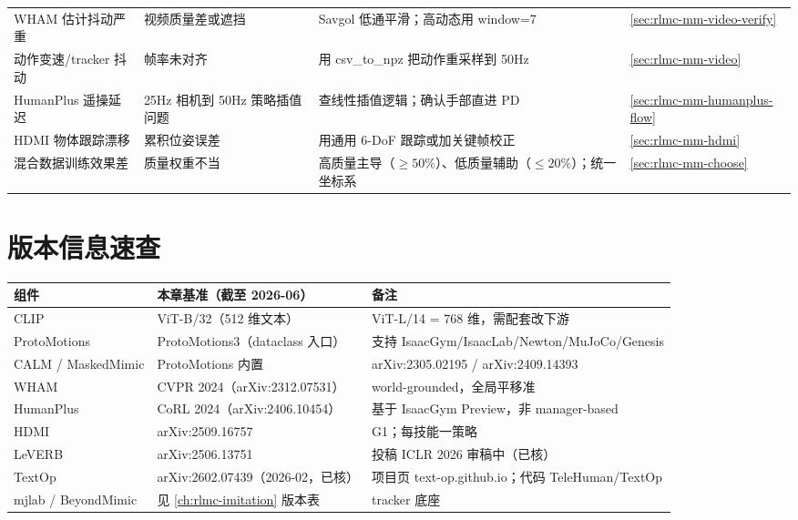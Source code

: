 \begin{center}
\begin{tabular}{@{}p{3.4cm}p{3.0cm}p{4.4cm}l@{}}
WHAM 估计抖动严重 & 视频质量差或遮挡 & Savgol 低通平滑；高动态用 window=7 & \cref{sec:rlmc-mm-video-verify} \\
动作变速/tracker 抖动 & 帧率未对齐 & 用 csv\_to\_npz 把动作重采样到 50Hz & \cref{sec:rlmc-mm-video} \\
HumanPlus 遥操延迟 & 25Hz 相机到 50Hz 策略插值问题 & 查线性插值逻辑；确认手部直进 PD & \cref{sec:rlmc-mm-humanplus-flow} \\
HDMI 物体跟踪漂移 & 累积位姿误差 & 用通用 6-DoF 跟踪或加关键帧校正 & \cref{sec:rlmc-mm-hdmi} \\
混合数据训练效果差 & 质量权重不当 & 高质量主导（$\ge50\%$）、低质量辅助（$\le20\%$）；统一坐标系 & \cref{sec:rlmc-mm-choose} \\
\bottomrule
\end{tabular}
\end{center}

\section*{版本信息速查}
\label{sec:rlmc-mm-versions}

\begin{center}
\small
\begin{tabular}{@{}lll@{}}
\toprule
组件 & 本章基准（截至 2026-06） & 备注 \\
\midrule
CLIP & ViT-B/32（512 维文本） & ViT-L/14 = 768 维，需配套改下游 \\
ProtoMotions & ProtoMotions3（dataclass 入口） & 支持 IsaacGym/IsaacLab/Newton/MuJoCo/Genesis \\
CALM / MaskedMimic & ProtoMotions 内置 & arXiv:2305.02195 / arXiv:2409.14393 \\
WHAM & CVPR 2024（arXiv:2312.07531） & world-grounded，全局平移准 \\
HumanPlus & CoRL 2024（arXiv:2406.10454） & 基于 IsaacGym Preview，非 manager-based \\
HDMI & arXiv:2509.16757 & G1；每技能一策略 \\
LeVERB & arXiv:2506.13751 & 投稿 ICLR 2026 审稿中（已核） \\
TextOp & arXiv:2602.07439（2026-02，已核） & 项目页 text-op.github.io；代码 TeleHuman/TextOp \\
mjlab / BeyondMimic & 见 \cref{ch:rlmc-imitation} 版本表 & tracker 底座 \\
\bottomrule
\end{tabular}
\end{center}
